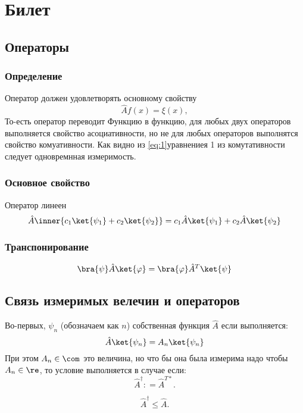 \section{Билет}
\subsection{Операторы}
\subsubsection{Определение}
Оператор должен удовлетворять основному свойству
\begin{equation} 
 \hat A f(x) = \xi (x), 
\end{equation} 
То-есть оператор переводит Функцию в функцию, для 
любых двух операторов выполняется свойство асоциативности, 
но не для любых операторов выполнятся свойство комуативности. 
Как видно из \ref{eq:1}{уравнениея 1} из комутативности следует 
одновремнная измеримость.
\subsubsection{Основное свойство}
Оператор линеен
\begin{equation} 
  \hat A \inner{c_1 \ket{\psi_1} + c_2 \ket{\psi_2}} = 
  c_1 \hat A \ket{\psi_1} + c_2 \hat A \ket{\psi_2}
\end{equation} 
\subsubsection{Транспонирование}
\begin{equation} 
 \bra{\psi} \hat A \ket{\varphi} = \bra{\varphi} \hat A^T \ket{\psi} 
\end{equation}

\subsection{Связь измеримых велечин и операторов}
Во-первых, $\psi_n$ (обозначаем как $n$) собственная функция 
$\hat A $ если выполняется:
\begin{equation} 
 \hat A \ket{\psi_n} = A_n \ket{\psi_n}
\end{equation} 
При этом $A_n \in \com$ это величина, но что бы она была измерима 
надо чтобы  $A_n \in \re$, то условие выполняется в случае если: 
\begin{equation} 
    \hat A^\dag : = \hat A^{T *}.
\end{equation} 

\begin{equation} 
    \hat A^\dag \leqslant \hat A.
\end{equation} 










